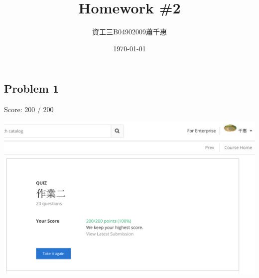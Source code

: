 \documentclass[12pt, a4paper]{article}
\title{\vspace{-4ex}\bf{\LARGE{Homework \#2}}}
\author{資工三\space\space\space B04902009\space\space\space 蕭千惠} %
\date{\vspace{-2ex}\today\vspace{-4ex}}
\begin{document}
	\begin{CJK}{UTF8}{bkai} %
	\maketitle\thispagestyle{fancy}
	\linespread{1.5}
	\fontsize{12pt}{18pt} \selectfont

	\section*{Problem 1}
		Score: 200 / 200 \par
		\includegraphics[width=16.5cm, keepaspectratio=true]{1.png}
	

\end{CJK}
\end{document}
